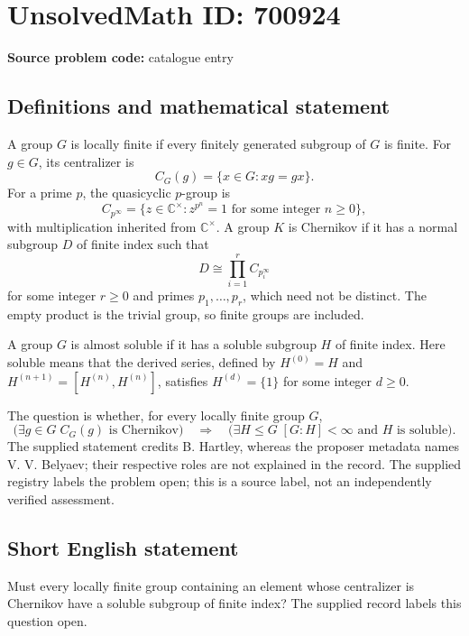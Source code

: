 \documentclass[11pt]{article}
\newcommand{\C}{\mathbb{C}}
\begin{document}
\section*{UnsolvedMath ID: 700924}
\textbf{Source problem code:} catalogue entry
\subsection{Definitions and mathematical statement}
A group \(G\) is locally finite if every finitely generated subgroup of \(G\) is finite. For \(g\in G\), its centralizer is
\[
C_G(g)=\{x\in G:xg=gx\}.
\]
For a prime \(p\), the quasicyclic \(p\)-group is
\[
C_{p^\infty}=\{z\in\C^\times:z^{p^n}=1\text{ for some integer }n\geq 0\},
\]
with multiplication inherited from \(\C^\times\). A group \(K\) is Chernikov if it has a normal subgroup \(D\) of finite index such that
\[
D\cong\prod_{i=1}^{r}C_{p_i^\infty}
\]
for some integer \(r\geq 0\) and primes \(p_1,\ldots,p_r\), which need not be distinct. The empty product is the trivial group, so finite groups are included.

A group \(G\) is almost soluble if it has a soluble subgroup \(H\) of finite index. Here soluble means that the derived series, defined by \(H^{(0)}=H\) and \(H^{(n+1)}=[H^{(n)},H^{(n)}]\), satisfies \(H^{(d)}=\{1\}\) for some integer \(d\geq 0\).

The question is whether, for every locally finite group \(G\),
\[
\bigl(\exists g\in G\; C_G(g)\text{ is Chernikov}\bigr)
\quad\Longrightarrow\quad
\bigl(\exists H\leq G\; [G:H]<\infty\text{ and }H\text{ is soluble}\bigr).
\]
The supplied statement credits B. Hartley, whereas the proposer metadata names V. V. Belyaev; their respective roles are not explained in the record. The supplied registry labels the problem open; this is a source label, not an independently verified assessment.
\subsection{Short English statement}
Must every locally finite group containing an element whose centralizer is Chernikov have a soluble subgroup of finite index? The supplied record labels this question open.
\end{document}
